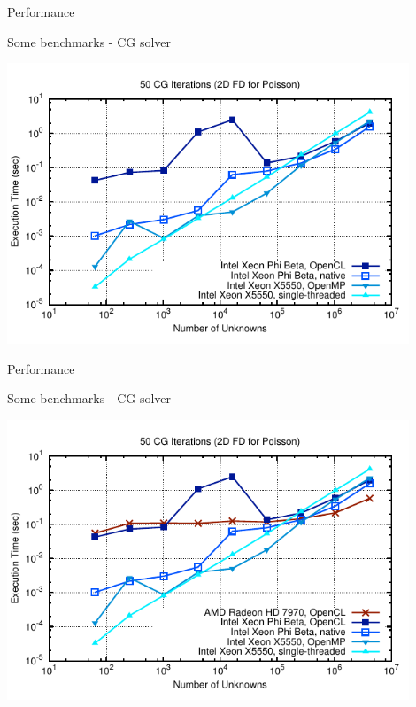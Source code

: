 \begin{frame}{Performance}
\begin{block}{Some benchmarks - CG solver}
  \begin{center}
   \includegraphics[width=0.9\textwidth]{figs/cg-timings-4}
  \end{center}
\end{block}
\end{frame}

\begin{frame}{Performance}
\begin{block}{Some benchmarks - CG solver}
  \begin{center}
   \includegraphics[width=0.9\textwidth]{figs/cg-timings-5}
  \end{center}
\end{block}
\end{frame}

